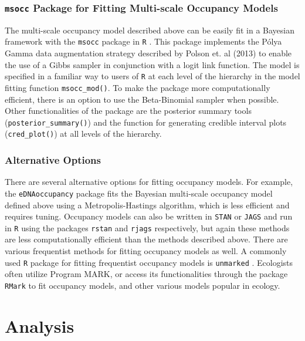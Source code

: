 \documentclass[12pt]{article}\usepackage[]{graphicx}\usepackage[]{color}
\begin{document}
\subsubsection{\texttt{msocc} Package for Fitting Multi-scale Occupancy Models}

The multi-scale occupancy model described above \cite{Dorazio_Erickson} can be easily fit in a Bayesian framework with the \texttt{msocc} package in \texttt{R} \cite{Stratton}. This package implements the P\'{o}lya Gamma data augmentation strategy described by Polson et. al (2013) to enable the use of a Gibbs sampler in conjunction with a logit link function. The model is specified in a familiar way to users of \texttt{R} at each level of the hierarchy in the model fitting function \texttt{msocc\_mod()}. To make the package more computationally efficient, there is an option to use the Beta-Binomial sampler when possible. Other functionalities of the package are the posterior summary tools (\texttt{posterior\_summary()}) and the function for generating credible interval plots (\texttt{cred\_plot()}) at all levels of the hierarchy. 

\subsubsection{Alternative Options}

There are several alternative options for fitting occupancy models. For example, the \texttt{eDNAoccupancy} \cite{Dorazio_Erickson} package fits the Bayesian multi-scale occupancy model defined above using a Metropolis-Hastings algorithm, which is less efficient and requires tuning. Occupancy models can also be written in \texttt{STAN} or \texttt{JAGS} and run in \texttt{R} using the packages \texttt{rstan} \cite{rstan} and \texttt{rjags} \cite{rjags} respectively, but again these methods are less computationally efficient than the methods described above. There are various frequentist methods for fitting occupancy models as well. A commonly used \texttt{R} package for fitting frequentist occupancy models is \texttt{unmarked} \cite{unmarked}. Ecologists often utilize Program MARK, or access its functionalities through the  package \texttt{RMark} \cite{RMark} to fit occupancy models, and other various models popular in ecology.

\section{Analysis}
\end{document}

